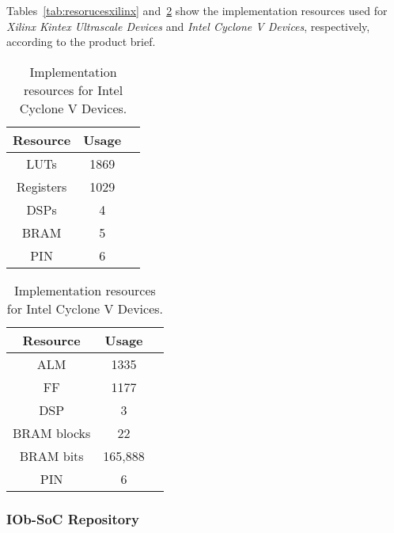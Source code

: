 Tables~\ref{tab:resorucesxilinx} and~\ref{tab:resorucescyclone} show the implementation resources used for \textit{Xilinx Kintex Ultrascale Devices} and \textit{Intel Cyclone V Devices}, respectively, according to the product brief.

\vspace{0.8cm}

\begin{table}[H]
\parbox{.45\linewidth}{
\centering
\begin{tabular}{|c|c|c|}
        \hline
         \textbf{Resource} & \textbf{Usage}  \\
         \hline
         LUTs & 1869 \\
         \hline
         Registers & 1029 \\
         \hline
         DSPs & 4 \\
         \hline
         BRAM & 5 \\
         \hline
         PIN & 6 \\
         \hline
\end{tabular}
\caption{Implementation resources for Xilinx Kintex
Ultrascale Devices.}
\label{tab:resorucesxilinx}
}
\hfill
\parbox{.45\linewidth}{
\centering
\begin{tabular}{|c|c|c|}
        \hline
         \textbf{Resource} & \textbf{Usage}  \\
         \hline
         ALM & 1335 \\
         \hline
         FF & 1177 \\
         \hline
         DSP & 3 \\
         \hline
         BRAM blocks & 22 \\
         \hline
         BRAM bits & 165,888 \\
         \hline
         PIN & 6 \\
         \hline
\end{tabular}
\caption{Implementation resources for Intel Cyclone
V Devices.}
\label{tab:resorucescyclone}
}
\end{table}


\subsubsection{IOb-SoC Repository}

